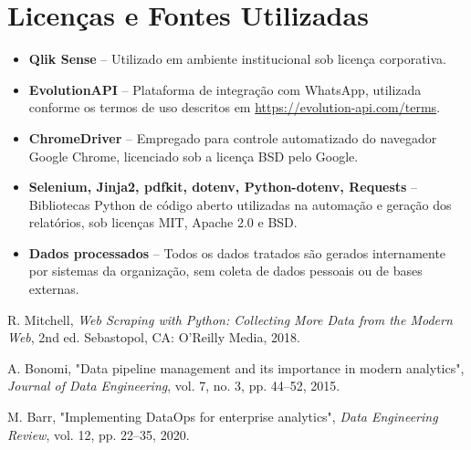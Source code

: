 \documentclass[conference]{IEEEtran}
\begin{document}
\section*{Licenças e Fontes Utilizadas}
\begin{itemize}
  \item \textbf{Qlik Sense} – Utilizado em ambiente institucional sob licença corporativa.
  \item \textbf{EvolutionAPI} – Plataforma de integração com WhatsApp, utilizada conforme os termos de uso descritos em \url{https://evolution-api.com/terms}.
  \item \textbf{ChromeDriver} – Empregado para controle automatizado do navegador Google Chrome, licenciado sob a licença BSD pelo Google.
  \item \textbf{Selenium, Jinja2, pdfkit, dotenv, Python-dotenv, Requests} – Bibliotecas Python de código aberto utilizadas na automação e geração dos relatórios, sob licenças MIT, Apache 2.0 e BSD.
  \item \textbf{Dados processados} – Todos os dados tratados são gerados internamente por sistemas da organização, sem coleta de dados pessoais ou de bases externas.
\end{itemize}

\begin{thebibliography}{99}

R. Mitchell, \textit{Web Scraping with Python: Collecting More Data from the Modern Web}, 2nd ed. Sebastopol, CA: O'Reilly Media, 2018.

A. Bonomi, "Data pipeline management and its importance in modern analytics", \textit{Journal of Data Engineering}, vol. 7, no. 3, pp. 44--52, 2015.

M. Barr, "Implementing DataOps for enterprise analytics", \textit{Data Engineering Review}, vol. 12, pp. 22--35, 2020.

\end{thebibliography}
\end{document}

